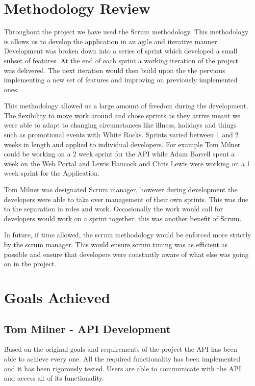 \documentclass[11pt,a4paper]{report}
\begin{document}
\section{Methodology Review}
\label{sec:methodology-review}
Throughout the project we have used the Scrum methodology. This methodology is allows us to develop the application in an agile and iterative manner. Development was broken down into a series of sprint which developed a small subset of features. At the end of each sprint a working iteration of the project was delivered. The next iteration would then build upon the the pervious implementing a new set of features and improving on previously implemented ones. 

This methodology allowed us a large amount of freedom during the development. The flexibility to move work around and chose sprints as they arrive meant we were able to adapt to changing circumstances like illness, holidays and things such as promotional events with White Rocks. Sprints varied between 1 and 2 weeks in length and applied to individual developers. For example Tom Milner could be working on a 2 week sprint for the API while Adam Barrell spent a week on the Web Portal and Lewis Hancock and Chris Lewis were working on a 1 week sprint for the Application. 

Tom Milner was designated Scrum manager, however during development the developers were able to take over management of their own sprints. This was due to the separation in roles and work. Occasionally the work would call for developers would work on a sprint together, this was another benefit of Scrum. 

In future, if time allowed, the scrum methodology would be enforced more strictly by the scrum manager. This would ensure scrum timing was as efficient as possible and ensure that developers were constantly aware of what else was going on in the project. 

\section{Goals Achieved}
\label{sec:goals-achieved}

\subsection{Tom Milner - API Development}

Based on the original goals and requirements of the project the API has been able to achieve every one. All the required functionality has been implemented and it has been rigorously tested. Users are able to communicate with the API and access all of its functionality. 
\end{document}
